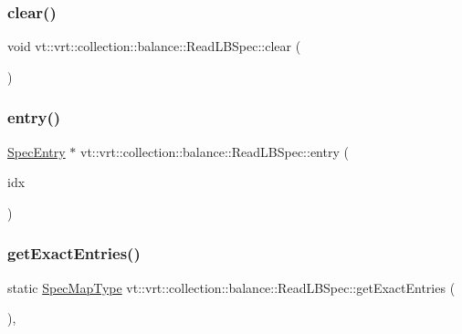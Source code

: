\subsubsection{\texorpdfstring{clear()}{clear()}}
{\footnotesize\ttfamily void vt\+::vrt\+::collection\+::balance\+::\+Read\+L\+B\+Spec\+::clear (\begin{DoxyParamCaption}{ }\end{DoxyParamCaption})\hspace{0.3cm}{\ttfamily [static]}}

\mbox{\label{structvt_1_1vrt_1_1collection_1_1balance_1_1_read_l_b_spec_af9e1e7f7ea03e6a7bc06d38c2ca28544}} 
\subsubsection{\texorpdfstring{entry()}{entry()}}
{\footnotesize\ttfamily \hyperlink{structvt_1_1vrt_1_1collection_1_1balance_1_1_spec_entry}{Spec\+Entry} $\ast$ vt\+::vrt\+::collection\+::balance\+::\+Read\+L\+B\+Spec\+::entry (\begin{DoxyParamCaption}\item[{\hyperlink{namespacevt_1_1vrt_1_1collection_1_1balance_a72a5e0d9936ddf57f8e6c64e0e9fd123}{Spec\+Index} const \&}]{idx }\end{DoxyParamCaption})\hspace{0.3cm}{\ttfamily [static]}}

\mbox{\label{structvt_1_1vrt_1_1collection_1_1balance_1_1_read_l_b_spec_a9a982a88b574472a21a3e574cc6c27ba}} 
\subsubsection{\texorpdfstring{get\+Exact\+Entries()}{getExactEntries()}}
{\footnotesize\ttfamily static \hyperlink{structvt_1_1vrt_1_1collection_1_1balance_1_1_read_l_b_spec_aa73c3611c615832402eeeed6fb7b8049}{Spec\+Map\+Type} vt\+::vrt\+::collection\+::balance\+::\+Read\+L\+B\+Spec\+::get\+Exact\+Entries (\begin{DoxyParamCaption}{ }\end{DoxyParamCaption})\hspace{0.3cm}{\ttfamily [inline]}, {\ttfamily [static]}}

